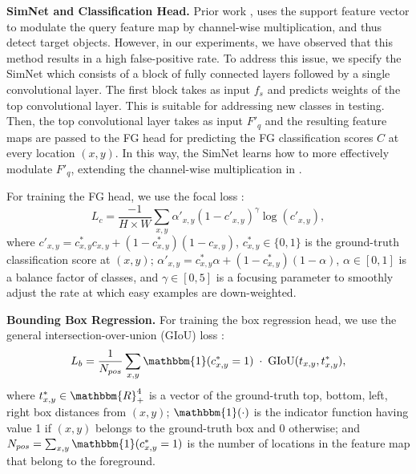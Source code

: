 \documentclass[final]{cvpr}
\begin{document}
 

{\bf SimNet and Classification Head.} Prior work \cite{yanICCV19metarcnn,michaelis2018one},
uses the support feature vector to modulate the
query feature map by channel-wise multiplication, and thus detect target objects. However, in our experiments, we have observed that this method results in a high false-positive rate. To address this issue, we specify the SimNet which consists of a block of fully connected layers followed by a single convolutional layer. The first block takes as input $f_s$ and predicts weights of the top convolutional layer. This is suitable for addressing new classes in testing. Then, the top convolutional layer takes as input $F'_q$ and the resulting feature maps are passed to the FG head for predicting the FG classification scores $C$ at every location $(x,y)$. In this way, the SimNet learns how to more effectively modulate $F'_q$, extending the channel-wise multiplication in \cite{yanICCV19metarcnn,michaelis2018one}.



For training the FG head, we use the focal loss  \cite{lin2017focal}:
%
\begin{equation}
\label{eq:cls_loss_function}
    L_{c} = \frac{-1}{H \times W} \sum_{x,y}\alpha'_{x,y}(1 - c'_{x,y})^\gamma \log(c'_{x,y}),
\end{equation} 
%
where $c'_{x,y} = c^*_{x,y}c_{x,y} + (1-c^*_{x,y})(1-c_{x,y})$, $c^*_{x, y}\in\{0,1\}$ is the ground-truth classification score at $(x,y)$; $\alpha'_{x,y} = c^*_{x,y}\alpha + (1-c^*_{x,y})(1-\alpha)$, $\alpha \in [0, 1]$ is a  balance factor of classes, and $\gamma \in [0, 5]$ is a focusing parameter to smoothly adjust the rate at which easy examples are down-weighted. 

{\bf Bounding Box Regression.}
For training the box regression head, we use the general intersection-over-union (GIoU) loss \cite{rezatofighi2019generalized}: 
%
\begin{equation}
\label{eq:reg_loss_function}
    L_{b} = \frac{1}{N_{pos}} \sum_{x,y} {\mathbbm{1}(c^*_{x, y} = 1)} \;\cdot\; \text{GIoU} (t_{x,y}, t^*_{x,y}),
\end{equation} 
%
where $t^*_{x,y}\in\mathbbm{R}_+^4$ is a vector of the  ground-truth top, bottom, left, right box distances from $(x, y)$;  $\mathbbm{1}(\cdot)$ is the indicator function having value 1 if $(x,y)$ belongs to the ground-truth box and 0 otherwise; and $N_{pos} = \sum_{x,y} {\mathbbm{1}(c^*_{x, y} =1)}$ is the number of locations in the feature map that belong to the foreground.
\end{document}
